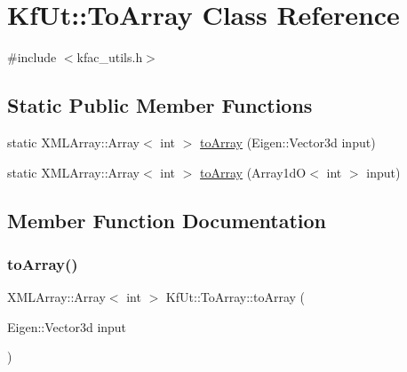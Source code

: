 \hypertarget{classKfUt_1_1ToArray}{}\section{Kf\+Ut\+:\+:To\+Array Class Reference}
\label{classKfUt_1_1ToArray}


{\ttfamily \#include $<$kfac\+\_\+utils.\+h$>$}

\subsection*{Static Public Member Functions}
\begin{DoxyCompactItemize}
\item 
static X\+M\+L\+Array\+::\+Array$<$ int $>$ \mbox{\hyperlink{classKfUt_1_1ToArray_ac97892c7b8ae265fe9d91d3f823b3f98}{to\+Array}} (Eigen\+::\+Vector3d input)
\item 
static X\+M\+L\+Array\+::\+Array$<$ int $>$ \mbox{\hyperlink{classKfUt_1_1ToArray_a272ebce4969f38835c7a503a85a4f8d3}{to\+Array}} (Array1dO$<$ int $>$ input)
\end{DoxyCompactItemize}


\subsection{Member Function Documentation}
\mbox{\label{classKfUt_1_1ToArray_ac97892c7b8ae265fe9d91d3f823b3f98}} 
\subsubsection{\texorpdfstring{toArray()}{toArray()}\hspace{0.1cm}{\footnotesize\ttfamily [1/2]}}
{\footnotesize\ttfamily X\+M\+L\+Array\+::\+Array$<$ int $>$ Kf\+Ut\+::\+To\+Array\+::to\+Array (\begin{DoxyParamCaption}\item[{Eigen\+::\+Vector3d}]{input }\end{DoxyParamCaption})\hspace{0.3cm}{\ttfamily [static]}}

